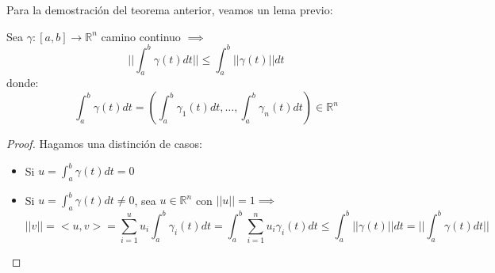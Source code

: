 Para la demostración del teorema anterior, veamos un lema previo: 
\begin{lema}
    Sea $\gamma: [a, b] \to \mathbb{R}^n$ camino continuo $\implies$
    $$||\int_{a}^{b} \gamma(t)dt|| \leq \int_{a}^{b}||\gamma(t)||dt$$
    donde: 
    $$\int_{a}^{b} \gamma(t)dt = (\int_{a}^{b} \gamma_1(t)dt, \ldots, \int_{a}^{b} \gamma_n(t)dt) \in \mathbb{R}^n$$
\end{lema}
\begin{proof}
    Hagamos una distinción de casos: 
    \begin{itemize}
        \item Si $u = \int_a^b \gamma(t)dt = 0$
        \item Si $u = \int_a^b \gamma(t)dt \neq 0$, sea $u \in \mathbb{R}^n$ con $||u|| = 1 \implies$ $$||v|| = <u, v> = \sum_{i = 1}^{u} u_i \int_{a}^{b} \gamma_i(t)dt = \int_{a}^{b} \sum_{i = 1}^{n} u_i \gamma_i(t)dt \leq \int_{a}^{b}||\gamma(t)||dt = ||\int_{a}^{b} \gamma(t)dt||$$
    \end{itemize}
\end{proof}

